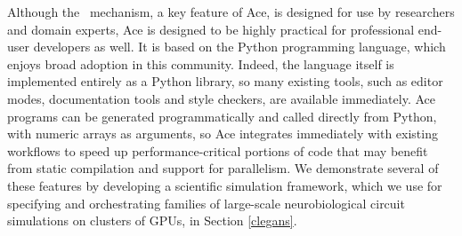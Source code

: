 \documentclass[10pt, conference, compsocconf]{IEEEtran}
\begin{document}
Although the \ATT~mechanism, a key feature of Ace, is designed for use by researchers and domain experts, Ace is designed to be highly practical for professional end-user developers as well. It is based on the Python programming language, which enjoys broad adoption in this community. Indeed, the language itself is implemented entirely as a Python library, so many existing tools, such as editor modes, documentation tools and style checkers, are available immediately.
Ace programs can be generated programmatically and called directly from Python, with numeric arrays as arguments, so Ace integrates immediately with existing workflows to speed up performance-critical portions of code that may benefit from static compilation and support for parallelism.
We demonstrate several of these features by developing a scientific simulation framework, which we use for specifying and orchestrating families of large-scale neurobiological circuit simulations on clusters of GPUs, in Section \ref{clegans}.



%
%
\end{document}
